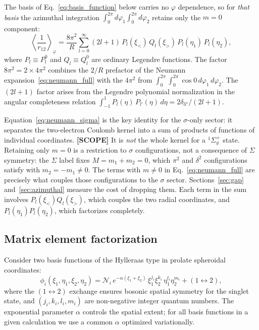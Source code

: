 \documentclass[aps,pra,twocolumn,superscriptaddress,longbibliography]{revtex4-2}
\begin{document}
The basis of Eq.~\eqref{eq:basis_function} below carries no
$\varphi$ dependence, so for \emph{that basis} the azimuthal
integration $\int_0^{2\pi} d\varphi_1 \int_0^{2\pi} d\varphi_2$
retains only the $m = 0$ component:
\begin{equation}
  \left\langle\frac{1}{r_{12}}\right\rangle_\varphi
  = \frac{8\pi^2}{R}\sum_{l=0}^{\infty}(2l+1)\,
    P_l(\xi_<)\,Q_l(\xi_>)\,
    P_l(\eta_1)\,P_l(\eta_2),
  \label{eq:neumann_sigma}
\end{equation}
where $P_l \equiv P_l^0$ and $Q_l \equiv Q_l^0$ are ordinary
Legendre functions.  The factor $8\pi^2 = 2 \times 4\pi^2$ combines
the $2/R$ prefactor of the Neumann
expansion~\eqref{eq:neumann_full} with the $4\pi^2$ from
$\int_0^{2\pi}\!\int_0^{2\pi}\!\cos 0\,d\varphi_1\,d\varphi_2$.
The $(2l+1)$ factor arises from the Legendre polynomial
normalization in the angular completeness relation
$\int_{-1}^{1}P_l(\eta)\,P_{l'}(\eta)\,d\eta = 2\delta_{ll'}/(2l+1)$.

Equation~\eqref{eq:neumann_sigma} is the key identity for the
$\sigma$-only sector: it separates the two-electron Coulomb kernel
into a sum of products of functions of individual coordinates.
\textbf{[SCOPE]} It is \emph{not} the whole kernel for a
$^1\Sigma_g^+$ state.  Retaining only $m = 0$ is a restriction to
$\sigma$ configurations, not a consequence of $\Sigma$ symmetry: the
$\Sigma$ label fixes $M = m_1 + m_2 = 0$, which $\pi^2$ and
$\delta^2$ configurations satisfy with $m_2 = -m_1 \ne 0$.  The
terms with $m \ne 0$ in Eq.~\eqref{eq:neumann_full} are precisely
what couples those configurations to the $\sigma$ sector.
Sections~\ref{sec:gap} and~\ref{sec:azimuthal} measure the cost of
dropping them.  Each term in the sum
involves $P_l(\xi_<) Q_l(\xi_>)$, which couples the two radial
coordinates, and $P_l(\eta_1) P_l(\eta_2)$, which factorizes
completely.

\subsection{Matrix element factorization}

Consider two basis functions of the Hylleraas type in prolate
spheroidal coordinates:
\begin{equation}
  \phi_i(\xi_1, \eta_1, \xi_2, \eta_2)
  = \mathcal{N}_i\,e^{-\alpha(\xi_1 + \xi_2)}\,
    \xi_1^{j_i}\xi_2^{k_i}\,\eta_1^{l_i}\eta_2^{m_i}
    + (1 \leftrightarrow 2),
  \label{eq:basis_function}
\end{equation}
where the $(1 \leftrightarrow 2)$ exchange ensures bosonic
spatial symmetry for the singlet state, and
$(j_i, k_i, l_i, m_i)$ are non-negative integer quantum
numbers.  The exponential parameter $\alpha$ controls the
spatial extent; for all basis functions in a given calculation
we use a common $\alpha$ optimized variationally.
\end{document}
